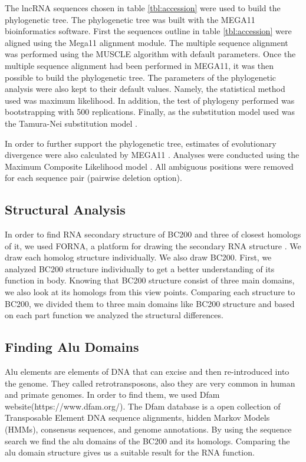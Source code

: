\documentclass[conference]{IEEEtran}
\begin{document}
The lncRNA sequences chosen in table \ref{tbl:accession} were used to build the phylogenetic tree. 
The phylogenetic tree was built with the MEGA11 \cite{tamura2021mega11} bioinformatics software. 
First the sequences outline in table \ref{tbl:accession} were aligned using the Mega11 alignment module. 
The multiple sequence alignment was performed using the MUSCLE algorithm with default parameters. 
Once the multiple sequence alignment had been performed in MEGA11, it was then possible to build the phylogenetic tree. 
The parameters of the phylogenetic analysis were also kept to their default values. 
Namely, the statistical method used was maximum likelihood. 
In addition, the test of phylogeny performed was bootstrapping with 500 replications.
Finally, as the substitution model used was the Tamura-Nei substitution model \cite{tamura1993estimation}. 

In order to further support the phylogenetic tree, estimates of evolutionary divergence were also calculated by MEGA11 \cite{tamura2021mega11}. 
Analyses were conducted using the Maximum Composite Likelihood model \cite{tamura2004prospects}. 
All ambiguous positions were removed for each sequence pair (pairwise deletion option). 

\subsection{Structural Analysis}\label{sec:structure}

In order to find RNA secondary structure of BC200 and three of closest homologs of it, we used FORNA, a platform for drawing the secondary RNA structure \cite{kerpedjiev2015forna}. 
We draw each homolog structure individually. 
We also draw BC200. 
First, we analyzed BC200 structure individually to get a better understanding of its function in body. 
Knowing that BC200 structure consist of three main domains, we also look at its homologs from this view points. 
Comparing each structure to BC200, we divided them to three main domains like BC200 structure and based on each part function we analyzed the structural differences.

\subsection{Finding Alu Domains}

Alu elements are elements of DNA that can excise and then re-introduced into the genome. They called retrotransposons, also they are very common in human and primate genomes\cite{dombroski1994vivo}. In order to find them, we used Dfam website(https://www.dfam.org/). The Dfam database is a open collection of Transposable Element DNA sequence alignments, hidden Markov Models (HMMs), consensus sequences, and genome annotations. By using the sequence search we find the alu domains of the BC200 and its homologs. Comparing the alu domain structure gives us a suitable result for the RNA function.
\end{document}
